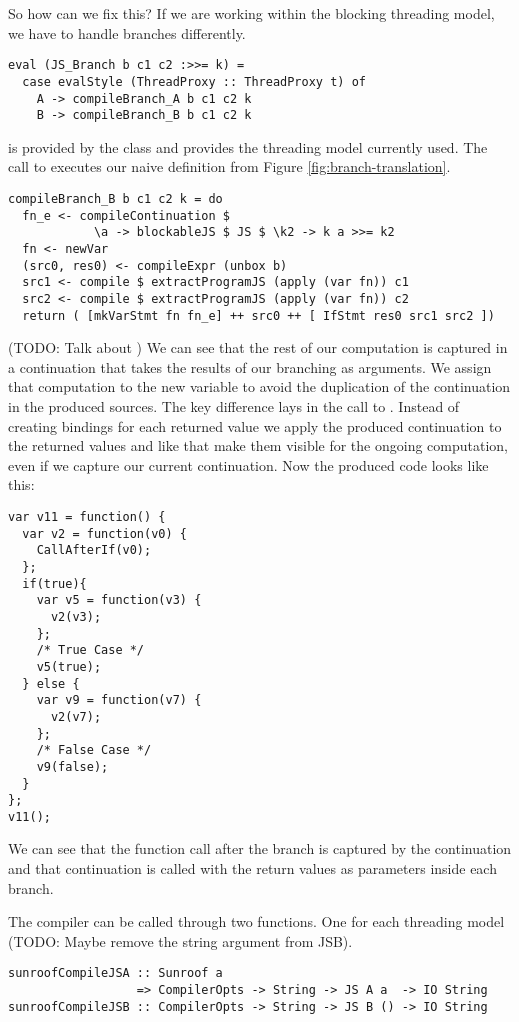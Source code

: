 So how can we fix this? If we are working within the blocking 
threading model, we have to handle branches differently.
\begin{verbatim}
eval (JS_Branch b c1 c2 :>>= k) = 
  case evalStyle (ThreadProxy :: ThreadProxy t) of
    A -> compileBranch_A b c1 c2 k
    B -> compileBranch_B b c1 c2 k
\end{verbatim}
 is provided by the class  and
provides the threading model currently used. The call to 
executes our naive definition from Figure \ref{fig:branch-translation}.
\begin{verbatim}
compileBranch_B b c1 c2 k = do
  fn_e <- compileContinuation $
            \a -> blockableJS $ JS $ \k2 -> k a >>= k2
  fn <- newVar
  (src0, res0) <- compileExpr (unbox b)
  src1 <- compile $ extractProgramJS (apply (var fn)) c1
  src2 <- compile $ extractProgramJS (apply (var fn)) c2
  return ( [mkVarStmt fn fn_e] ++ src0 ++ [ IfStmt res0 src1 src2 ])
\end{verbatim}
(TODO: Talk about )
We can see that the rest of our computation is captured in a
continuation  that takes the results of our branching
as arguments. We assign that computation to the new variable 
to avoid the duplication of the continuation in the produced sources.
The key difference lays in the call to . Instead
of creating bindings for each returned value we apply the produced
continuation to the returned values and like that make them visible for
the ongoing computation, even if we capture our current continuation. 
Now the produced code looks like this:
\begin{verbatim}
var v11 = function() {
  var v2 = function(v0) {
    CallAfterIf(v0);
  };
  if(true){
    var v5 = function(v3) {
      v2(v3);
    };
    /* True Case */
    v5(true);
  } else {
    var v9 = function(v7) {
      v2(v7);
    };
    /* False Case */
    v9(false);
  }
};
v11();
\end{verbatim}
We can see that the function call after the branch is captured by the 
continuation  and that continuation is called with the 
return values as parameters inside each branch.


The compiler can be called through two functions. 
One for each threading model (TODO: Maybe remove the string argument from JSB).
\begin{verbatim}
sunroofCompileJSA :: Sunroof a 
                  => CompilerOpts -> String -> JS A a  -> IO String
sunroofCompileJSB :: CompilerOpts -> String -> JS B () -> IO String
\end{verbatim}


